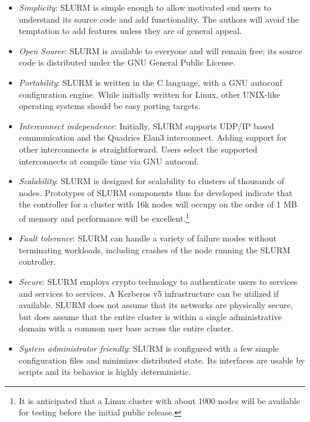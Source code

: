 \begin{itemize}
\item {\em Simplicity}: SLURM is simple enough to allow motivated end users
to understand its source code and add functionality.  The authors will 
avoid the temptation to add features unless they are of general appeal. 

\item {\em Open Source}: SLURM is available to everyone and will remain free;
its source code is distributed under the GNU General Public License.

\item {\em Portability}: SLURM is written in the C language, with a GNU 
autoconf configuration engine.  While initially written for Linux, 
other UNIX-like operating systems should be easy porting targets.

\item {\em Interconnect independence}: Initially, SLURM supports UDP/IP based
communication and the Quadrics Elan3 interconnect.  Adding support for other
interconnects is straightforward.  Users select the supported interconnects
at compile time via GNU autoconf.

\item {\em Scalability}: SLURM is designed for scalability to clusters of
thousands of nodes.
Prototypes of SLURM components thus far developed indicate that the
controller for a cluster with 16k nodes will occupy on the order of 1 MB 
of memory and performance will be excellent.\footnote{It is anticipated 
that a Linux cluster with about 1000 nodes will be available for testing 
before the initial public release.}

\item {\em Fault tolerance}: SLURM can handle a variety of failure modes
without terminating workloads, including crashes of the node running the SLURM
controller.

\item {\em Secure}: SLURM employs crypto technology to authenticate 
users to services and services to services.  
A Kerberos v5 infrastructure can be utilized if available.
SLURM does not assume that its networks are physically secure, 
but does assume that the entire cluster is within a single 
administrative domain with a common user base across the 
entire cluster.

\item {\em System administrator friendly}: SLURM is configured with a few
simple configuration files and minimizes distributed state.  Its interfaces
are usable by scripts and its behavior is highly deterministic.

\end{itemize}

